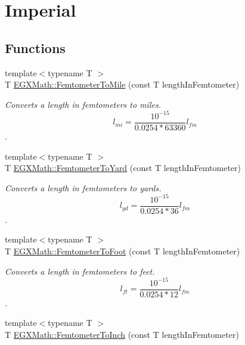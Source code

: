 \hypertarget{group___e_g_x_math-_conversions-_length_conversions-_s_i-_femtometer-_imperial}{}\section{Imperial}
\label{group___e_g_x_math-_conversions-_length_conversions-_s_i-_femtometer-_imperial}
\subsection*{Functions}
\begin{DoxyCompactItemize}
\item 
{\footnotesize template$<$typename T $>$ }\\T \mbox{\hyperlink{group___e_g_x_math-_conversions-_length_conversions-_s_i-_femtometer-_imperial_ga8973c4ada3a3bc89034978a0ba7c2693}{E\+G\+X\+Math\+::\+Femtometer\+To\+Mile}} (const T length\+In\+Femtometer)
\begin{DoxyCompactList}\small\item\em Converts a length in femtometers to miles. \[ l_{mi}=\frac{10^{-15}}{0.0254 * 63360} l_{fm} \]. \end{DoxyCompactList}\item 
{\footnotesize template$<$typename T $>$ }\\T \mbox{\hyperlink{group___e_g_x_math-_conversions-_length_conversions-_s_i-_femtometer-_imperial_ga4416c9d0cb07df4b86f23afe6b7f6e91}{E\+G\+X\+Math\+::\+Femtometer\+To\+Yard}} (const T length\+In\+Femtometer)
\begin{DoxyCompactList}\small\item\em Converts a length in femtometers to yards. \[ l_{yd}= \frac{10^{-15}}{0.0254 * 36} l_{fm} \]. \end{DoxyCompactList}\item 
{\footnotesize template$<$typename T $>$ }\\T \mbox{\hyperlink{group___e_g_x_math-_conversions-_length_conversions-_s_i-_femtometer-_imperial_gaa33efbf3b5cee0874ad44736c0ac6fd2}{E\+G\+X\+Math\+::\+Femtometer\+To\+Foot}} (const T length\+In\+Femtometer)
\begin{DoxyCompactList}\small\item\em Converts a length in femtometers to feet. \[ l_{ft}= \frac{10^{-15}}{0.0254 * 12} l_{fm} \]. \end{DoxyCompactList}\item 
{\footnotesize template$<$typename T $>$ }\\T \mbox{\hyperlink{group___e_g_x_math-_conversions-_length_conversions-_s_i-_femtometer-_imperial_ga51c3107a7cfac96232eb0b040c3192a1}{E\+G\+X\+Math\+::\+Femtometer\+To\+Inch}} (const T length\+In\+Femtometer)

\end{DoxyCompactItemize}
